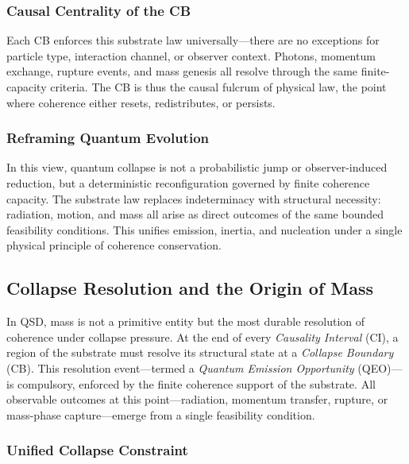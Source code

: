 \documentclass[preprints,article,submit,pdftex,moreauthors]{Definitions/mdpi}
\begin{document}
\subsubsection*{Causal Centrality of the CB}

Each CB enforces this substrate law universally—there are no exceptions for particle type, interaction channel, or observer context. Photons, momentum exchange, rupture events, and mass genesis all resolve through the same finite-capacity criteria. The CB is thus the causal fulcrum of physical law, the point where coherence either resets, redistributes, or persists.

\subsubsection*{Reframing Quantum Evolution}

In this view, quantum collapse is not a probabilistic jump or observer-induced reduction, but a deterministic reconfiguration governed by finite coherence capacity. The substrate law replaces indeterminacy with structural necessity: radiation, motion, and mass all arise as direct outcomes of the same bounded feasibility conditions. This unifies emission, inertia, and nucleation under a single physical principle of coherence conservation.


\subsection{Collapse Resolution and the Origin of Mass}

In QSD, mass is not a primitive entity but the most durable resolution of coherence under collapse pressure. At the end of every \emph{Causality Interval} (CI), a region of the substrate must resolve its structural state at a \emph{Collapse Boundary} (CB). This resolution event—termed a \emph{Quantum Emission Opportunity} (QEO)—is compulsory, enforced by the finite coherence support of the substrate. All observable outcomes at this point—radiation, momentum transfer, rupture, or mass-phase capture—emerge from a single feasibility condition.

\subsubsection*{Unified Collapse Constraint}
\end{document}

